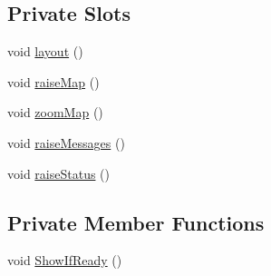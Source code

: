 \subsection*{Private Slots}
\begin{DoxyCompactItemize}
\item 
void \hyperlink{classNetHackQtMainWindow_a09d5d1a04f86f5d76e3fb7b954f6a2d4}{layout} ()
\item 
void \hyperlink{classNetHackQtMainWindow_a0f6f9603fc059448aa66d8854646ee6b}{raise\+Map} ()
\item 
void \hyperlink{classNetHackQtMainWindow_a6f953f54cc38f43ef7936a484665a8a6}{zoom\+Map} ()
\item 
void \hyperlink{classNetHackQtMainWindow_a2396a3baf0672126ee6c671e62bbd52f}{raise\+Messages} ()
\item 
void \hyperlink{classNetHackQtMainWindow_a0efea9cf3842ef57a92251a947d6652e}{raise\+Status} ()
\end{DoxyCompactItemize}
\subsection*{Private Member Functions}
\begin{DoxyCompactItemize}
\item 
void \hyperlink{classNetHackQtMainWindow_a5f157f9cb901112d1ab3f4805a566273}{Show\+If\+Ready} ()
\end{DoxyCompactItemize}
